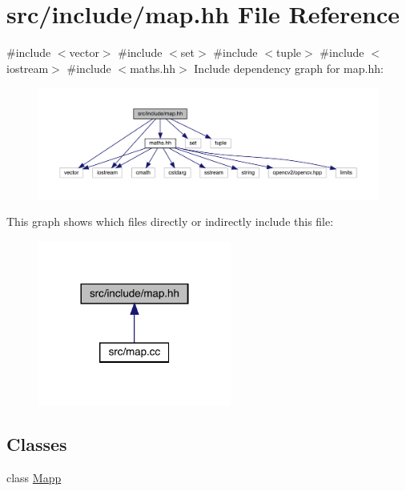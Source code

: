 \hypertarget{map_8hh}{}\section{src/include/map.hh File Reference}
\label{map_8hh}
{\ttfamily \#include $<$vector$>$}\newline
{\ttfamily \#include $<$set$>$}\newline
{\ttfamily \#include $<$tuple$>$}\newline
{\ttfamily \#include $<$iostream$>$}\newline
{\ttfamily \#include $<$maths.\+hh$>$}\newline
Include dependency graph for map.\+hh\+:
\nopagebreak
\begin{figure}[H]
\begin{center}
\leavevmode
\includegraphics[width=350pt]{map_8hh__incl}
\end{center}
\end{figure}
This graph shows which files directly or indirectly include this file\+:
\nopagebreak
\begin{figure}[H]
\begin{center}
\leavevmode
\includegraphics[width=180pt]{map_8hh__dep__incl}
\end{center}
\end{figure}
\subsection*{Classes}
\begin{DoxyCompactItemize}
\item 
class \mbox{\hyperlink{class_mapp}{Mapp}}
\end{DoxyCompactItemize}
